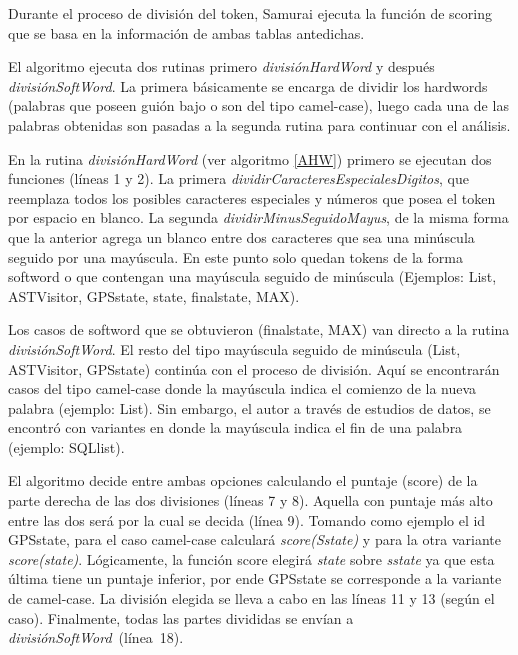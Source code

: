 \documentclass[a4paper,12pt]{report}
\begin{document}
Durante el proceso de división del token, Samurai ejecuta la función de scoring que se basa en la información de ambas tablas antedichas.


El algoritmo ejecuta dos rutinas primero \textit{divisiónHardWord} y después \mbox{\textit{divisiónSoftWord}}. La primera básicamente se encarga de dividir los hardwords (palabras que poseen guión bajo o son del tipo camel-case), luego cada una de las palabras obtenidas son pasadas a la segunda rutina para continuar con el análisis.

En la rutina \textit{divisiónHardWord} (ver algoritmo \ref{AHW}) primero se ejecutan dos funciones (líneas 1 y 2). La primera \textit{dividirCaracteresEspecialesDigitos}, que reemplaza todos los posibles caracteres especiales y números que posea el token por espacio en blanco. La segunda \mbox{\textit{dividirMinusSeguidoMayus}}, de la misma forma que la anterior agrega un blanco entre dos caracteres que sea una minúscula seguido por una mayúscula. En este punto solo quedan tokens de la forma softword o que contengan una mayúscula seguido de minúscula (Ejemplos: \textsf{List, ASTVisitor, GPSstate, state, finalstate, MAX}).

Los casos de softword que se obtuvieron (\textsf{finalstate}, \textsf{MAX}) van directo a la rutina \mbox{\textit{divisiónSoftWord}}.
El resto del tipo mayúscula seguido de minúscula (\textsf{List, ASTVisitor, GPSstate}) continúa con el proceso de división. Aquí se encontrarán casos del tipo \mbox{camel-case} donde la mayúscula indica el comienzo de la nueva palabra (ejemplo: \textsf{List}). Sin embargo, el autor a través de estudios de datos, se encontró con variantes en donde la mayúscula indica el fin de una palabra (ejemplo: \textsf{SQLlist}).
 
El algoritmo decide entre ambas opciones calculando el puntaje (score) de la parte derecha de las dos divisiones (líneas 7 y 8). Aquella con puntaje más alto entre las dos será por la cual se decida (línea 9). Tomando como ejemplo el id \textsf{GPSstate}, para el caso camel-case calculará \textit{score(Sstate)} y para la otra variante \textit{score(state)}. Lógicamente, la función score elegirá \textit{state} sobre \textit{sstate} ya que esta última tiene un puntaje inferior, por ende \textsf{GPSstate} se corresponde a la variante de camel-case. La división elegida se lleva a cabo en las líneas 11 y 13 (según el caso).
Finalmente, todas las partes divididas se envían a \mbox{\textit{divisiónSoftWord} (línea 18)}.
\end{document}
